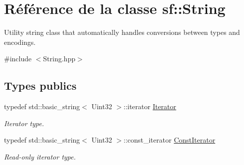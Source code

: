 \hypertarget{classsf_1_1String}{}\section{Référence de la classe sf\+:\+:String}
\label{classsf_1_1String}


Utility string class that automatically handles conversions between types and encodings.  




{\ttfamily \#include $<$String.\+hpp$>$}

\subsection*{Types publics}
\begin{DoxyCompactItemize}
\item 
\mbox{\label{classsf_1_1String_ac90f2b7b28f703020f8d027e98806235}} 
typedef std\+::basic\+\_\+string$<$ Uint32 $>$\+::iterator \hyperlink{classsf_1_1String_ac90f2b7b28f703020f8d027e98806235}{Iterator}
\begin{DoxyCompactList}\small\item\em Iterator type. \end{DoxyCompactList}\item 
\mbox{\label{classsf_1_1String_a8e18efc2e8464f6eb82818902d527efa}} 
typedef std\+::basic\+\_\+string$<$ Uint32 $>$\+::const\+\_\+iterator \hyperlink{classsf_1_1String_a8e18efc2e8464f6eb82818902d527efa}{Const\+Iterator}
\begin{DoxyCompactList}\small\item\em Read-\/only iterator type. \end{DoxyCompactList}\end{DoxyCompactItemize}
